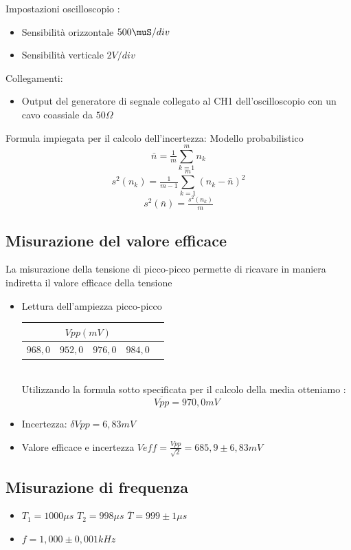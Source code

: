\documentclass[a4paper]{article}
\begin{document}
Impostazioni oscilloscopio :
\begin{itemize}
\item Sensibilità orizzontale \(500 \muS/div \)
\item Sensibilità verticale \(2 V/div\)
\end{itemize}

Collegamenti:
\begin{itemize}
\item Output del generatore di segnale collegato al CH1 dell'oscilloscopio con un cavo coassiale da \(50 \Omega\)  
\end{itemize}

Formula impiegata per il calcolo dell’incertezza: Modello probabilistico \[\bar{n} = \tfrac{1}{m}\sum_{k=1}^m n_k \]
\[s^2 (n_k)= \tfrac{1}{m-1}\sum_{k=1}^m (n_k - \bar{n})^2 \] 
\[s^2 (\bar{n}) = \tfrac{s^2 (n_k)}{m}\]

\subsection{Misurazione del valore efficace}

La misurazione della tensione di picco-picco permette di ricavare in maniera indiretta il valore efficace della tensione
\begin{itemize}
\item Lettura dell’ampiezza picco-picco \\ 
    \begin{tabular}{|r|l|l|l|l|}
     \hline
     \multicolumn{4}{|c|}{\(Vpp (mV)\)} \\
     \hline
     \(968,0\) & \(952,0\) & \(976,0\) & \(984,0\) \\
     \hline
   \end{tabular} \\
Utilizzando la formula sotto specificata per il calcolo della media otteniamo :
\[\overline{Vpp}= 970,0 mV\]
\item Incertezza: \(\delta{}  Vpp= 6,83 mV\)
\item Valore efficace e incertezza \(Veff= \tfrac{Vpp}{\sqrt{2}} = 685,9 \pm 6,83 mV \)
\end{itemize}

\subsection{Misurazione di frequenza}
\begin{itemize}
\item \(T_1 = 1000 \mu s\) \(T_2 = 998 \mu s\) \(\overline{T} = 999 \pm 1 \mu s\)
\item \(f= 1,000 \pm 0,001 kHz\)
\end{itemize}
\end{document}
